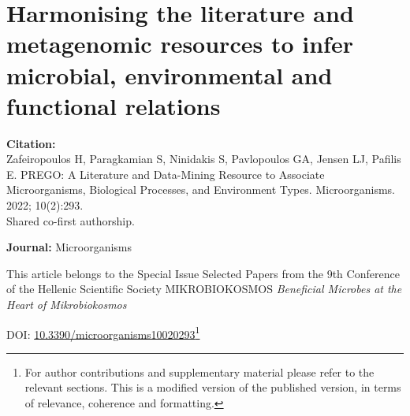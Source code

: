 % 
% 


\chapter{Harmonising the literature and metagenomic resources to infer microbial, environmental and functional relations}
\label{cha:prego}


\textbf{Citation:} \\ 
Zafeiropoulos H, Paragkamian S, Ninidakis S, Pavlopoulos GA, Jensen LJ, Pafilis E. PREGO: A Literature and Data-Mining Resource to Associate Microorganisms, Biological Processes, and Environment Types. Microorganisms. 2022; 10(2):293. \\ 
Shared co-first authorship.

\textbf{Journal:} Microorganisms

This article belongs to the Special Issue Selected Papers from the 9th Conference of the Hellenic Scientific Society MIKROBIOKOSMOS \textit{Beneficial Microbes at the Heart of Mikrobiokosmos}

DOI: \href{https://doi.org/10.3390/microorganisms10020293}{10.3390/microorganisms10020293}\footnote{
   For author contributions and supplementary material please refer to the relevant sections. 
   This is a modified version of the published version,
   in terms of relevance, coherence and formatting.}



